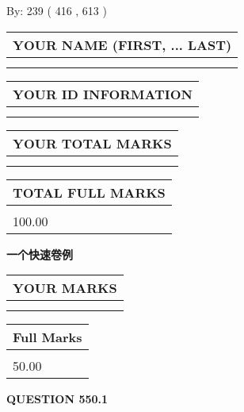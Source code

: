 \documentclass{ctexart}
\begin{document}
   
\hspace{1.0in} By: 
 239 ( 416 ,  613 )
   
   
   
   
\newpage 
\setcounter{page}{ 
   550001 } 
   
   
   
   
\noindent\begin{tabular}{|l|}
\hline
YOUR NAME (FIRST, ... LAST)  \\
\hline
 \\ 
 \\ 
\hline
\end{tabular}
\hspace{0.05in} \begin{tabular}{|l|}
\hline
 YOUR   ID   INFORMATION  \\
\hline
 \\ 
 \\ 
\hline
\end{tabular}
   
   
\vspace{0.2in}\noindent\begin{tabular}{|l|}
\hline
YOUR TOTAL MARKS  \\
\hline
 \\ 
 \\ 
\hline
\end{tabular}
\hspace{0.05in} \begin{tabular}{|l|}
\hline
TOTAL FULL MARKS  \\
\hline
 \\ 
100.00 \\
\hline
\end{tabular}
   
   
 \vspace{0.2in}
{\LARGE {\textbf{ 一个快速卷例}}}
   
   
  
\vspace{0.2in}
  
\noindent\begin{tabular}{|l|}
\hline
 YOUR MARKS  \\
\hline
 \\ 
 \\ 
\hline
\end{tabular}
\hspace{0.05in} \begin{tabular}{|l|}
\hline
 Full Marks  \\
\hline
 \\ 
50.00 \\
\hline
\end{tabular}
{\textbf{\Large{QUESTION
550.1 
}}}
  
\end{document}
